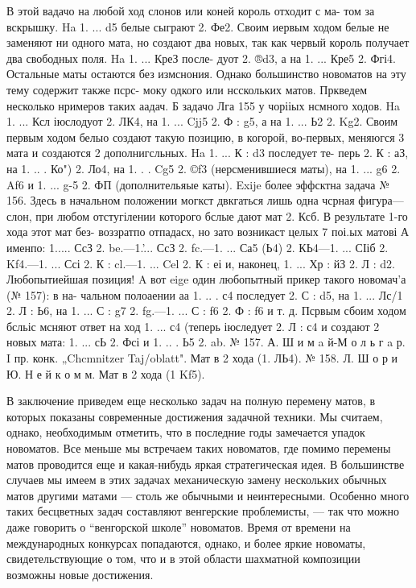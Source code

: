 {{    В этой вадачо на любой ход слонов или коней король отходит с ма- том за вскрышку. Ha 1. ... d5 белые сыграют 2. Фе2. Своим иервым ходом белые не заменяют ни одного мата, но создают два новых, так как червый король получает два свободных поля. Ha 1. ... КреЗ после- дуот 2. ®d3, а на 1. ... Кре5 2. Фгі4. Остальные маты остаются без измснония.
    Однако большинство новоматов на эту тему содержит также псрс- моку одкого или нсскольких матов. Пркведем несколько нримеров таких аадач.
    Б задачо Лга 155 у чорііых нсмного ходов. Ha 1. ... Ксл іюслодуот
2. ЛК4, на 1. ... Cjj5 2. Ф : g5, а на 1. ... Ь2 2. Kg2. Своим первым ходом белыо создают такую позицию, в когорой, во-первых, меняюгся 3 мата и создаются 2 дополнигсльных. Ha 1. ... К : d3 последует те- перь 2. К : аЗ, на 1. .. . Ко") 2. Ло4, на 1. . . Cg5 2. ©f3 (нерсменившиеся маты), на 1. ... g6 2. Af6 и 1. ... g-5 2. ФП (дополнительяые каты).
    Exije более эффсктна задача № 156. Здесь в начальном положении могкст двкгаться лишь одна чсрная фигура—слон, при любом отстугілении которого бслые дают мат 2. Ксб. В результате 1-го хода этот мат без- воззратпо отпадасх, но зато возникаст целых 7 поі.ых матові А именпо: 1..... СсЗ 2. be.—1.'... СсЗ 2. fc.—1. ... Са5 (Ь4) 2. КЬ4—1. ... СІіб
2. Kf4.—1. ... Ссі 2. К : cl.—1. ... Cel 2. К : еі и, наконец, 1. ... Хр : йЗ 2. Л : d2. Любопытиейшая позиция!
    A вот eige один любопытный прикер такого новомач’а (№ 157): в на- чальном полоаении аа 1. .. . с4 последует 2. С : d5, на 1. ... Лс/1
2. Л : Ь6, на 1. ... С : g7 2. fg.—1. ... С : f6 2. Ф : f6 и т. д. Псрвым сбоим ходом бсльіс мсняют ответ на ход 1. ... с4 (теперь іюследует
2. Л : с4 и создают 2 новых мата: 1. ... сЬ 2. Фсі и 1. .. . Ь5 2. ab.
№ 157. А. Ш и м a й-М о л ь г a р.
I пр. конк. „Chcmnitzer Taj/oblatt". 
Мат в 2 хода (1. ЛЬ4).
	№ 158. Л. Ш о р и Ю. Н е й к о м м.
Мат в 2 хода (1 Kf5).

В заключение приведем еще несколько задач на полную перемену матов, в которых показаны современные достижения задачной техники. Мы считаем, однако, необходимым отметить, что в последние годы замечается упадок новоматов. Все меньше мы встречаем таких новоматов, где помимо перемены матов проводится еще и какая-нибудь яркая стратегическая идея. В большинстве случаев мы имеем в этих задачах механическую замену нескольких обычных матов другими матами — столь же обычными и неинтересными. Особенно много таких бесцветных задач составляют венгерские проблемисты, — так что можно даже говорить о ``венгорской школе'' новоматов. Время от времени на международных конкурсах попадаются, однако, и более яркие новоматы, свидетельствующие о том, что и в этой области шахматной композиции возможны новые достижения.

}}

